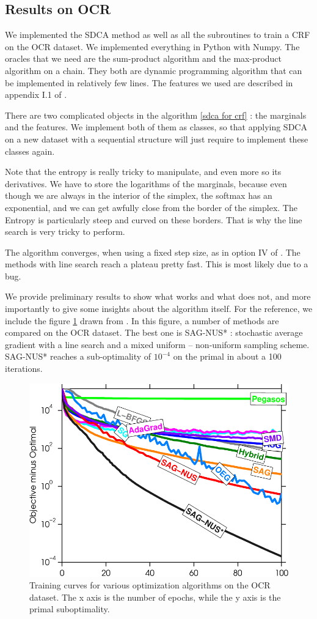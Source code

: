 \documentclass{article}
\DeclareMathOperator{\1}{\mathbb{1}}
\begin{document}
\subsection{Results on OCR}

We implemented the SDCA method as well as all the subroutines to train a CRF on the OCR dataset.
We implemented everything in Python with Numpy.
The oracles that we need are the sum-product algorithm and the max-product algorithm on a chain.
They both are dynamic programming algorithm that can be implemented in relatively few lines.
The features we used are described in appendix I.1 of \cite{osokin_minding_2016}.

There are two complicated objects in the algorithm \ref{sdca for crf} : the marginals and the features.
We implement both of them as classes, so that applying SDCA on a  new dataset with a sequential structure will just require to implement these classes again.

Note that the entropy is really tricky to manipulate, and even more so its derivatives.
We have to store the logarithms of the marginals, because even though we are always in the interior of the simplex, the softmax has an exponential, and we can get awfully close from the border of the simplex.
The Entropy is particularly steep and curved on these borders.
That is why the line search is very tricky to perform.

The algorithm converges, when using a fixed step size, as in option IV of \cite{shalev-shwartz_accelerated_2013-1}.
The methods with line search reach a plateau pretty fast.
This is most likely due to a bug.

We provide preliminary results to show what works and what does not, and more importantly to give some insights about the algorithm itself. 
For the reference, we include the figure \ref{schmidt's curves} drawn from \cite{schmidt_non-uniform_2015}.
In this figure, a number of methods are compared on the OCR dataset.
The best one is SAG-NUS* : stochastic average gradient with a line search and a mixed uniform -- non-uniform sampling scheme.
SAG-NUS* reaches a sub-optimality of $10^{-4}$ on the primal in about a 100 iterations.

\begin{figure}[ht]
	\center
	\includegraphics[width=.5\textwidth]{images/ocr2_train_passes.pdf}
	\caption{Training curves for various optimization algorithms on the OCR dataset. The x axis is the number of epochs, while the y axis is the primal suboptimality.}
	\label{schmidt's curves}
\end{figure}
\end{document}
